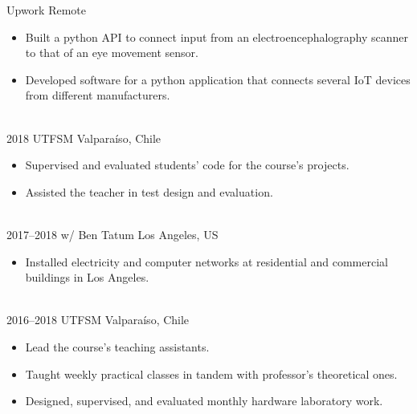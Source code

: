 \documentclass[a4paper]{cv-style}
\begin{document}
\begin{entrylist}
            {Upwork}
            {Remote}
            {
            \begin{itemize}
                \item
                    Built a python API to connect input from an electroencephalography scanner to that of an eye movement sensor.
                \item
                    Developed software for a python application that connects several IoT devices from different manufacturers.
            \end{itemize}} \\
        \entry
            {2018}
            {UTFSM}
            {Valpara\'iso, Chile}
            {
            \begin{itemize}
                \item
                    Supervised and evaluated students' code for the course's projects.
                \item
                    Assisted the teacher in test design and evaluation.
            \end{itemize}} \\
        \entry
            {2017--2018}
            {w/ Ben Tatum}
            {Los Angeles, US}
            {
            \begin{itemize}
                \item
                    Installed electricity and computer networks at residential and commercial buildings in Los Angeles.
            \end{itemize}} \\
        \entry
            {2016--2018}
            {UTFSM}
            {Valpara\'iso, Chile}
            {
            \begin{itemize}
                \item
                    Lead the course's teaching assistants.
                \item
                    Taught weekly practical classes in tandem with professor's theoretical ones.
                \item
                    Designed, supervised, and evaluated monthly hardware laboratory work.
            \end{itemize}}
    \end{entrylist}

\end{document}
